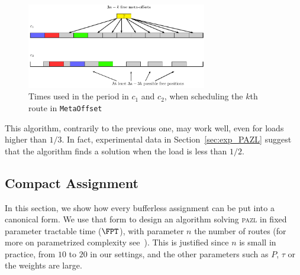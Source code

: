 \documentclass[a4paper,10pt]{article}
\newcommand\metaoffset{\texttt{MetaOffset}\xspace}
\newcommand\pazl{\textsc{pazl}\xspace}
\begin{document}
     \begin{figure}
      \begin{center}
      \includegraphics[width=0.7\textwidth]{ex3nt.pdf}
      \end{center}
      \caption{Times used in the period in $c_1$ and $c_2$, when scheduling the $k$th route in \metaoffset}
      \label{fig:metaoffset}
      \end{figure}


% 
% 
% 
	
This algorithm, contrarily to the previous one, may work well, even for loads higher than $1/3$.
In fact, experimental data in Section~\ref{sec:exp_PAZL} suggest that the algorithm finds a solution when the load is less than $1/2$.


\subsection{Compact Assignment}

In this section, we show how every bufferless assignment can be put into a canonical form.
We use that form to design an algorithm solving \pazl in fixed parameter tractable time ($\FPT$), with parameter $n$ the number of routes (for more on parametrized complexity see~\cite{downey2012parameterized}). This is justified since $n$ is small in practice, from $10$ to $20$ in our settings, and the other parameters such as $P$, $\tau$ or the weights are large.
\end{document}
